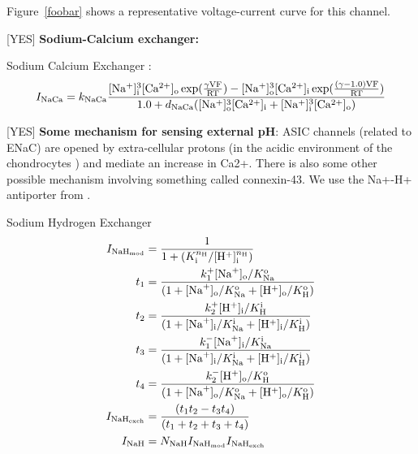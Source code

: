 Figure~\ref{foobar} shows a representative voltage-current curve for
this channel.

[YES] {\bf Sodium-Calcium exchanger:}

Sodium Calcium Exchanger \citep[Table 13, pp. 77]{Nygrenetal1998}:
\begin{equation}
  I_{\rm NaCa} = k_{\rm NaCa} \frac{[\rm Na^{+}]^{3}_{i}[\rm
    Ca^{2+}]_{o} \exp(\frac{\gamma V F}{R T}) - [\rm
    Na^{+}]^{3}_{o}[\rm Ca^{2+}]_{i} \exp(\frac{(\gamma - 1.0) V F}{R
      T})} {1.0 + d_{\rm NaCa}([\rm Na^{+}]^{3}_{o}[\rm Ca^{2+}]_{i} +
    [\rm Na^{+}]^{3}_{i}[\rm Ca^{2+}]_{o})}
\end{equation}

[YES] {\bf Some mechanism for sensing external pH}: ASIC channels
(related to ENaC) are opened by extra-cellular protons (in the acidic
environment of the chondrocytes ) and mediate an increase in
Ca2+. There is also some other possible mechanism involving something
called connexin-43. We use the Na+-H+ antiporter from
\citet{Halletal1996,Wilkinsetal2000}.


Sodium Hydrogen Exchanger \citep[Eq. 2, pp. 2675]{Chaetal2009}
\begin{equation}
  \begin{split}
    I_{{\rm NaH}_{\rm mod}} & = \frac{1}{1 + (K_{\rm i}^{n_{\rm
          H}}/[{\rm H}^{+}]_{\rm i}^{n_{\rm H}})}\\
    t_{1} & = \frac{k_{1}^{+} [{\rm Na}^{+}]_{\rm o}/K_{\rm Na}^{\rm
        o}} {(1 + [{\rm Na}^{+}]_{\rm o}/K_{\rm Na}^{\rm o} + [{\rm
        H}^{+}]_{\rm o} /K_{\rm H}^{\rm o})}\\
    t_{2} & = \frac{k_{2}^{+} [{\rm H}^{+}]_{\rm i}/K_{\rm H}^{\rm i}}
    {(1 + [{\rm Na}^{+}]_{\rm i}/K_{\rm Na}^{\rm i} + [{\rm
        H}^{+}]_{\rm i}/K_{\rm H}^{\rm i})}\\
    t_{3} & = \frac{k_{1}^{-} [{\rm Na}^{+}]_{\rm i}/K_{\rm Na}^{\rm
        i}} {(1 + [{\rm Na}^{+}]_{\rm i}/K_{\rm Na}^{\rm i} + [{\rm
        H}^{+}]_{\rm i} /K_{\rm H}^{\rm i})}\\
    t_{4} & = \frac{k_{2}^{-} [{\rm H}^{+}]_{\rm o}/K_{\rm H}^{\rm
        o}} {(1 + [{\rm Na}^{+}]_{\rm o}/K_{\rm Na}^{\rm o} + [{\rm
        H}^{+}]_{\rm o} /K_{\rm H}^{\rm o})}\\
    I_{{\rm NaH}_{\rm exch}} & = \frac{(t_1 t_2 - t_3 t_4)}
    {(t_1 + t_2 + t_3 + t_4)}\\
    I_{\rm NaH} & = N_{\rm NaH} I_{\rm NaH_{\rm mod}}
    I_{\rm NaH_{\rm exch}}
  \end{split}
\end{equation}

